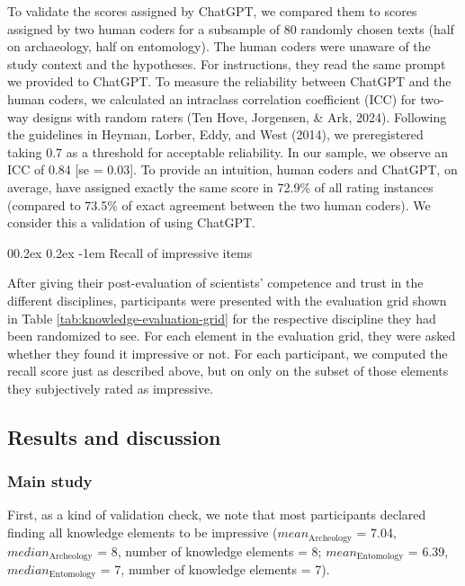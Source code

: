 \documentclass[
  doc,floatsintext]{apa6}
\makeatletter
\let\oldparagraph\paragraph
\renewcommand{\paragraph}{
    \@ifstar
      \xxxParagraphStar
      \xxxParagraphNoStar
  }
\newcommand{\xxxParagraphStar}[1]{\oldparagraph*{#1}\mbox{}}
\newcommand{\xxxParagraphNoStar}[1]{\oldparagraph{#1}\mbox{}}
\renewcommand{\paragraph}{\@startsection{paragraph}{4}{\parindent}%
  {0\baselineskip \@plus 0.2ex \@minus 0.2ex}%
  {-1em}%
  {\normalfont\normalsize\bfseries\itshape\typesectitle}}
\makeatother
\begin{document}
To validate the scores assigned by ChatGPT, we compared them to scores assigned by two human coders for a subsample of 80 randomly chosen texts (half on archaeology, half on entomology). The human coders were unaware of the study context and the hypotheses. For instructions, they read the same prompt we provided to ChatGPT. To measure the reliability between ChatGPT and the human coders, we calculated an intraclass correlation coefficient (ICC) for two-way designs with random raters (Ten Hove, Jorgensen, \& Ark, 2024). Following the guidelines in Heyman, Lorber, Eddy, and West (2014), we preregistered taking 0.7 as a threshold for acceptable reliability. In our sample, we observe an ICC of 0.84 {[}se = 0.03{]}. To provide an intuition, human coders and ChatGPT, on average, have assigned exactly the same score in 72.9\% of all rating instances (compared to 73.5\% of exact agreement between the two human coders). We consider this a validation of using ChatGPT.

\paragraph{Recall of impressive items}\label{recall-of-impressive-items}

After giving their post-evaluation of scientists' competence and trust in the different disciplines, participants were presented with the evaluation grid shown in Table \ref{tab:knowledge-evaluation-grid} for the respective discipline they had been randomized to see. For each element in the evaluation grid, they were asked whether they found it impressive or not. For each participant, we computed the recall score just as described above, but on only on the subset of those elements they subjectively rated as impressive.

\subsection{Results and discussion}\label{results-and-discussion-1}

\subsubsection{Main study}\label{main-study-1}

First, as a kind of validation check, we note that most participants declared finding all knowledge elements to be impressive (\(mean_{\text{Archeology}}\) = 7.04, \(median_{\text{Archeology}}\) = 8, number of knowledge elements = 8; \(mean_{\text{Entomology}}\) = 6.39, \(median_{\text{Entomology}}\) = 7, number of knowledge elements = 7).
\end{document}

